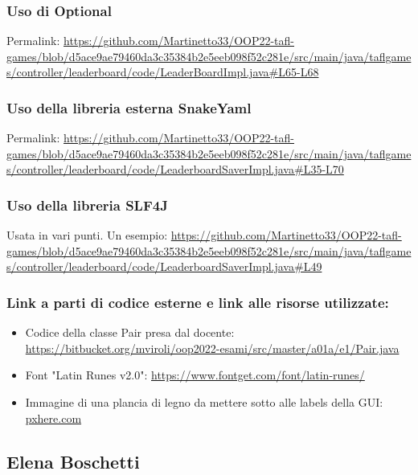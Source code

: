 \documentclass[a4paper,12pt]{report}
\begin{document}
\subsubsection{Uso di Optional}
Permalink: \url{https://github.com/Martinetto33/OOP22-tafl-games/blob/d5ace9ae79460da3c35384b2e5eeb098f52c281e/src/main/java/taflgames/controller/leaderboard/code/LeaderBoardImpl.java#L65-L68}

\subsubsection{Uso della libreria esterna SnakeYaml}
Permalink: \url{https://github.com/Martinetto33/OOP22-tafl-games/blob/d5ace9ae79460da3c35384b2e5eeb098f52c281e/src/main/java/taflgames/controller/leaderboard/code/LeaderboardSaverImpl.java#L35-L70}

\subsubsection{Uso della libreria SLF4J}
Usata in vari punti. Un esempio: \url{https://github.com/Martinetto33/OOP22-tafl-games/blob/d5ace9ae79460da3c35384b2e5eeb098f52c281e/src/main/java/taflgames/controller/leaderboard/code/LeaderboardSaverImpl.java#L49}

\subsubsection{Link a parti di codice esterne e link alle risorse utilizzate:}

\begin{itemize}
	
	\item Codice della classe Pair presa dal docente: \url{https://bitbucket.org/mviroli/oop2022-esami/src/master/a01a/e1/Pair.java}
	\item Font "Latin Runes v2.0": \url{ https://www.fontget.com/font/latin-runes/}
	\item Immagine di una plancia di legno da mettere sotto alle labels della GUI: \href{https://get.pxhere.com/photo/background-tree-wood-boards-texture-wooden-background-old-brown-wood-texture-gray-wood-old-tree-old-fence-the-texture-of-the-wood-rustik-rustic-rural-wood-background-old-boards-fence-1370487.jpg}{pxhere.com}
	
\end{itemize}

\subsection{Elena Boschetti}
\end{document}
